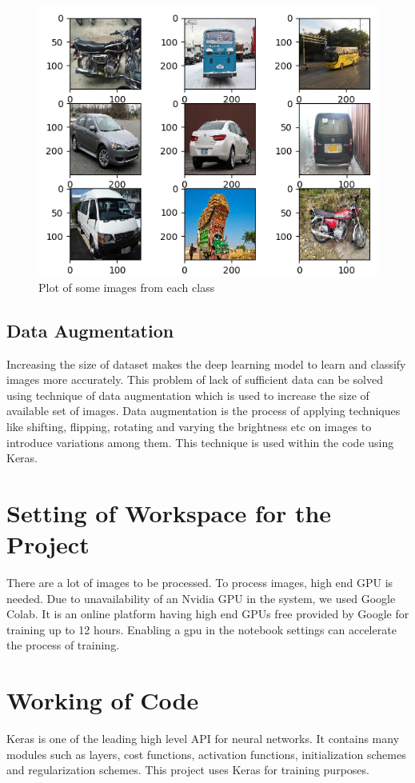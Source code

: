 \begin{figure}[H]
    \centering
    \captionsetup{justification = centering}
    \includegraphics[scale = 0.8]{CHAPTERS/Chapter-4/Images/4.1.png}
    \caption{Plot of some images from each class} 
    \label{fig:4.1}
  \end{figure}

\subsection{Data Augmentation}
Increasing the size of dataset makes the deep learning model to learn and classify images more accurately. This problem of lack of sufficient data can be solved using technique of data augmentation which is used to increase the size of available set of images.
Data augmentation is the process of applying techniques like shifting, flipping, rotating and varying the brightness etc on images to introduce variations among them.
This technique is used within the code using Keras.
\section{Setting of Workspace for the Project}
There are a lot of images to be processed. To process images, high end GPU is
needed. Due to unavailability of an Nvidia GPU in the system, we used Google Colab.
It is an online platform having high end GPUs free provided by Google for training
up to 12 hours. Enabling a gpu in the notebook settings can accelerate the process of
training.
\section{Working of Code}
Keras is one of the leading high level API for neural networks. It contains
many modules such as layers, cost functions, activation functions, initialization
schemes and regularization schemes. This project uses Keras for training purposes.
